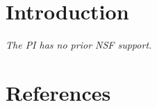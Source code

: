 \documentclass[fontsize=10pt,paper=letter,twoside=false,onecolumn,
   headings=small]{scrartcl} %
\begin{document}

\section{Introduction}

\vspace{1em}
\noindent\emph{The PI has no prior NSF support.}
\clearpage

\section*{References}
\nocite{End}
\nocite{*} %

\end{document}
